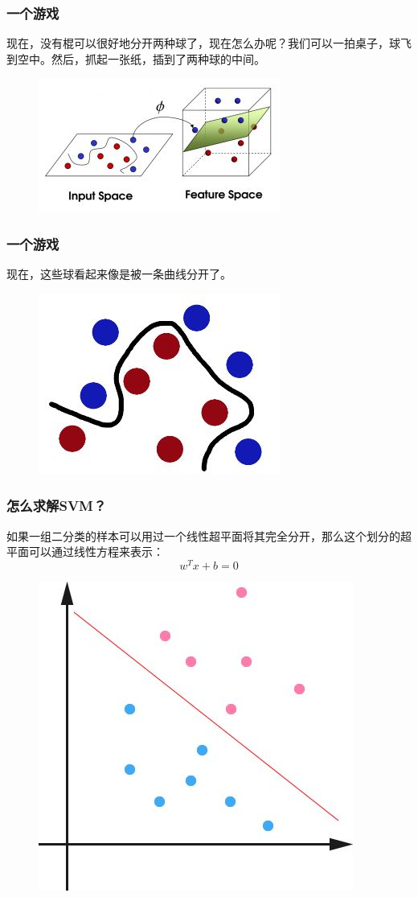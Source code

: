 \begin{frame}
\frametitle{一个游戏}	
现在，没有棍可以很好地分开两种球了，现在怎么办呢？我们可以一拍桌子，球飞到空中。然后，抓起一张纸，插到了两种球的中间。
           
	\begin{figure}[ht]
	\centering
	\includegraphics[width=0.5\linewidth]{partition/img/svm_8.jpg}  
	\end{figure}

\end{frame} 

\begin{frame}
\frametitle{一个游戏}	
现在，这些球看起来像是被一条曲线分开了。
           
	\begin{figure}[ht]
	\centering
	\includegraphics[width=0.5\linewidth]{partition/img/svm_9.jpg}  
	\end{figure}

\end{frame} 


\begin{frame}
\frametitle{怎么求解SVM？}	
 如果一组二分类的样本可以用过一个线性超平面将其完全分开，那么这个划分的超平面可以通过线性方程来表示：
 $$w^Tx +b = 0$$

           
	\begin{figure}[ht]
	\centering
	\includegraphics[width=0.5\linewidth]{partition/img/svm_10.jpg}  
	\end{figure}

\end{frame} 